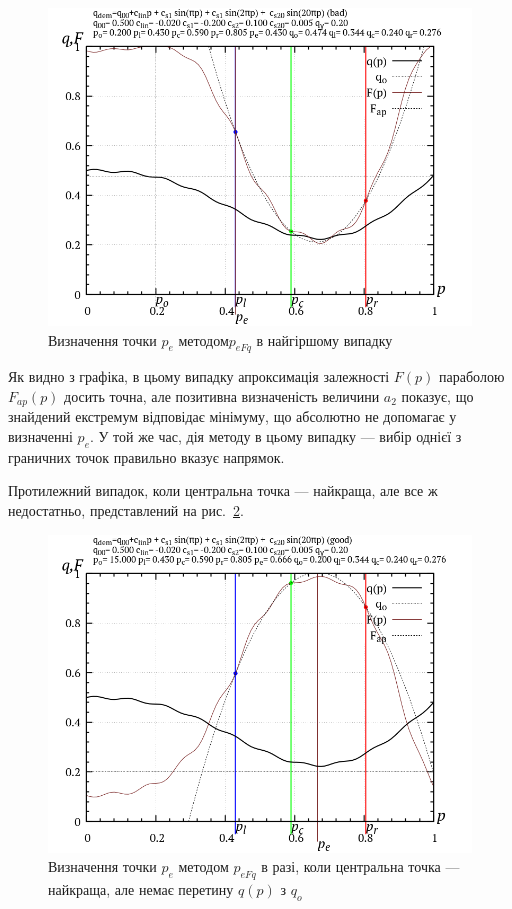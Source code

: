 \begin{figure}[htb!]
  \begin{center}
    \includegraphics[width=60\TW]{p/p_eFq/q_p_eFq_bad.png}
  \end{center}
  \caption{Визначення точки $p_e$ методом$ p_{eFq}$ в найгіршому випадку}
  \label{atu:f:p_eFq_bad}
\end{figure}

Як видно з графіка, в цьому випадку апроксимація залежності
$F(p)$ параболою
$F_{ap}(p) $ досить точна, але позитивна визначеність величини
$a_2 $ показує, що знайдений екстремум відповідає мінімуму, що
абсолютно не допомагає у визначенні
$p_e $. У той же час, дія методу в цьому випадку --- вибір однієї з
граничних точок правильно вказує напрямок.

Протилежний випадок, коли центральна точка --- найкраща, але все
ж недостатньо, представлений на рис.~\ref{atu:f:p_eFq_good}.

\begin{figure}[htb!]
  \begin{center}
    \includegraphics[width=60\TW]{p/p_eFq/q_p_eFq_good.png}
  \end{center}
  \caption{Визначення точки $p_e$ методом $p_{eFq}$ в разі, коли центральна точка --- найкраща, але немає перетину $q(p)$ з $ q_o $}
  \label{atu:f:p_eFq_good}
\end{figure}

